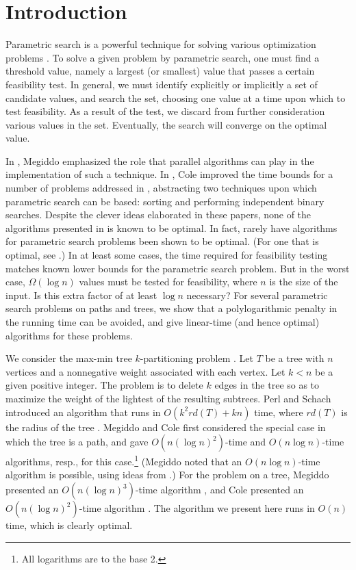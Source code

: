 \section{Introduction}

Parametric search is a powerful technique for solving various
optimization problems
\cite{AP,C1,C2,CSSS,FJ1,FJ2,Gu,M,R,S,Z}.
To solve a given problem by parametric search, one must find a threshold value, namely a largest (or smallest) value
that passes a certain feasibility test.
In general, we must identify explicitly or implicitly a set of candidate values, and search the set, 
choosing one value at a time upon which to test feasibility.
As a result of the test, we discard from further consideration various values in the set.
Eventually, the search will converge on the optimal value.
 
In \cite{M}, Megiddo emphasized the role that
parallel algorithms can play in the implementation of such
a technique.
In \cite{C2}, Cole improved the time bounds for a number of problems
addressed in \cite{M},
abstracting two techniques upon which parametric search can be based:
sorting and performing independent binary searches.
Despite the clever ideas elaborated in these papers,
none of the algorithms presented in \cite{M, C2} 
is known to be optimal.
In fact, rarely have algorithms for parametric search problems
been shown to be optimal.
(For one that is optimal, see \cite{CSSS}.)
In at least some cases, the time required for feasibility testing
matches known lower bounds for the parametric search problem.
But in the worst case, $\Omega (\log n)$ values must be tested for feasibility, where $n$ is the size of the input.
Is this extra factor of at least $\log n$ necessary?
For several parametric search problems on paths and trees,
we show that a polylogarithmic penalty in the running time can be avoided,
and give linear-time (and hence optimal) algorithms for these problems.

We consider the max-min tree $k$-partitioning problem \cite{PS}.
Let $T$ be a tree with $n$ vertices and a nonnegative weight associated with each vertex. 
Let $k < n$ be a given positive integer.
The problem is to delete $k$ edges in the tree so as to maximize the weight of the lightest of the resulting subtrees.
Perl and Schach introduced an algorithm that runs in $O(k^2 rd(T)+kn)$ time, where $rd(T)$ is the radius of the tree \cite{PS}.
Megiddo and Cole first considered the special case in which the tree is a path, and gave $O(n (\log n)^2)$-time and $O(n \log n)$-time algorithms, resp., for this case.\footnote{All logarithms are to the base 2.}
(Megiddo noted that an $O(n \log n)$-time algorithm is possible, using ideas from \cite{FJ1}.)
For the problem on a tree, Megiddo presented an $O(n( \log n)^3)$-time algorithm \cite{M}, and Cole presented an $O(n( \log n)^2)$-time algorithm \cite{C2}. 
The algorithm we present here runs in $O(n)$ time, which is clearly optimal.

